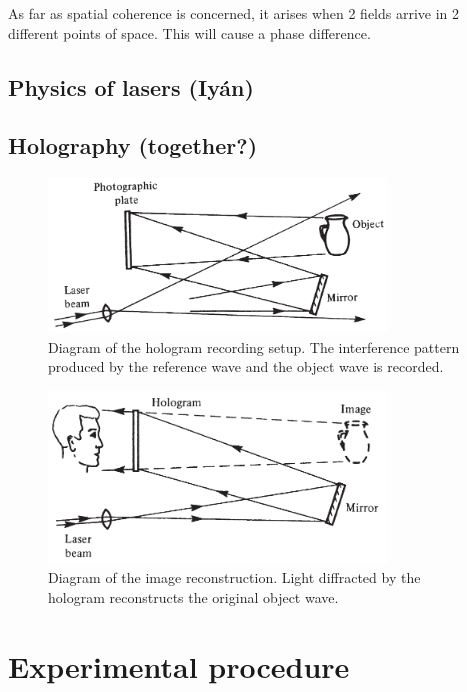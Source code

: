 \documentclass[11pt,a4paper]{article}
\begin{document}
As far as spatial coherence is concerned, it arises when 2 fields arrive in 2 different points of space. This will cause a phase difference.

\subsection{Physics of lasers (Iyán)}

\subsection{Holography (together?)}

\begin{figure}[ht]
\centering
\includegraphics[width=0.8\textwidth]{Hologram_recording}
\caption{Diagram of the hologram recording setup. The interference pattern produced by the reference wave and the object wave is recorded.\cite{hariharan_2002}}
\label{fig:hologram_recording}
\end{figure}

\begin{figure}[ht]
\centering
\includegraphics[width=0.8\textwidth]{Hologram_image_reconstruction}
\caption{Diagram of the image reconstruction. Light diffracted by the hologram reconstructs the original object wave.\cite{hariharan_2002}}
\label{fig:hologram_reconstruction}
\end{figure}

\section{Experimental procedure}
\end{document}
